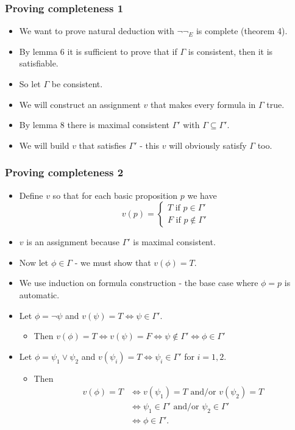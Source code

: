 \documentclass[handout]{beamer}
\begin{document}
\begin{frame}
\frametitle{Proving completeness 1}
\begin{itemize}
\item We want to prove natural deduction with $\neg\neg_E$ is complete (theorem 4).
\vspace{0.3cm}
\item By lemma 6 it is sufficient to prove that if $\Gamma$ is consistent, then it is satisfiable.
\vspace{0.3cm}
\item So let $\Gamma$ be consistent.
\vspace{0.3cm}
\item We will construct an assignment $v$ that makes every formula in $\Gamma$ true.
\vspace{0.3cm}
\item By lemma 8 there is maximal consistent $\Gamma'$ with $\Gamma\subseteq \Gamma'$.
\vspace{0.3cm}
\item We will build $v$ that satisfies $\Gamma'$ - this $v$ will obviously satisfy $\Gamma$ too.
\end{itemize}

\end{frame}

\begin{frame}
\frametitle{Proving completeness 2}
\begin{itemize}
\item Define $v$ so that for each basic proposition $p$ we have
\[v(p) = \begin{cases} T \text{ if }p\in\Gamma'\\ F \text{ if }p\notin\Gamma' \end{cases}\]
\item $v$ is an assignment because $\Gamma'$ is maximal consistent.
\item Now let $\phi\in\Gamma$ - we must show that $v(\phi) = T$.
\item We use induction on formula construction - the base case where $\phi = p$ is automatic.
\item Let $\phi = \neg \psi$ and $v(\psi)=T\iff \psi\in \Gamma'$.
\begin{itemize}
\item Then $v(\phi)=T\iff v(\psi)=F\iff \psi\not\in \Gamma'\iff\phi\in\Gamma'$
\end{itemize}
\item Let $\phi = \psi_1\vee \psi_2$ and $v(\psi_i)=T\iff \psi_i\in \Gamma'$ for $i=1,2$.
\begin{itemize}
\item Then \begin{align*}v(\phi)=T&\iff v(\psi_1)=T\text{  and/or }v(\psi_2)=T\\ 
&\iff \psi_1\in\Gamma'\text{ and/or }\psi_2\in\Gamma'\\
&\iff \phi\in\Gamma'.\end{align*} 
\end{itemize}
\end{itemize}

\end{frame}
\end{document}
